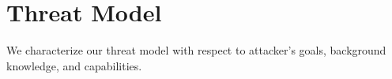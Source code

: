 \section{Threat Model}








We characterize our threat model with respect to attacker's goals, background knowledge, and capabilities. 


